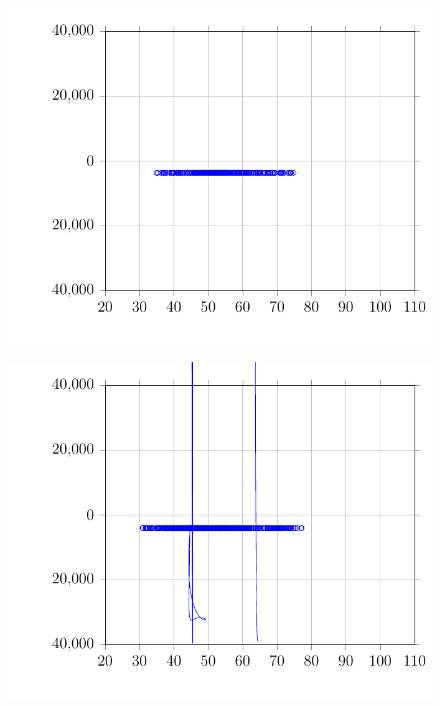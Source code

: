 \begin{figure}
\centering
\includegraphics{Plots/41-PrestonRoyalFPB-08-ZoneLoad/2017-08-07-0927-BtuhrvsOADryBulbTemperatureNOAAF.pdf}
\caption{}
\label{fig:2017-08-07-0927-BtuhrvsOADryBulbTemperatureNOAAFFPB-08}
\end{figure}

\begin{figure}
\centering
\includegraphics{Plots/42-PrestonRoyalFPB-09-ZoneLoad/2017-08-07-0928-BtuhrvsOADryBulbTemperatureNOAAF.pdf}
\caption{}
\label{fig:2017-08-07-0928-BtuhrvsOADryBulbTemperatureNOAAF}
\end{figure}

